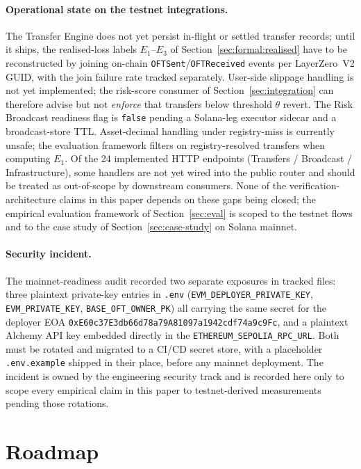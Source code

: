 \documentclass[11pt,a4paper]{article}
\begin{document}
\paragraph{Operational state on the testnet integrations.} The Transfer Engine
does not yet persist in-flight or settled transfer records; until it ships, the
realised-loss labels $E_1$--$E_3$ of Section~\ref{sec:formal:realised} have to
be reconstructed by joining on-chain \texttt{OFTSent}/\texttt{OFTReceived}
events per LayerZero~V2 GUID, with the join failure rate tracked separately.
User-side slippage handling is not yet implemented; the risk-score consumer
of Section~\ref{sec:integration} can therefore advise but not \emph{enforce}
that transfers below threshold $\theta$ revert. The Risk Broadcast readiness
flag is \texttt{false} pending a Solana-leg executor sidecar and a broadcast-store
TTL. Asset-decimal handling under registry-miss is currently unsafe; the
evaluation framework filters on registry-resolved transfers when computing
$E_1$. Of the 24 implemented HTTP endpoints (Transfers / Broadcast /
Infrastructure), some handlers are not yet wired into the public router and
should be treated as out-of-scope by downstream consumers. None of the
verification-architecture claims in this paper depends on these gaps being
closed; the empirical evaluation framework of Section~\ref{sec:eval} is scoped
to the testnet flows and to the case study of Section~\ref{sec:case-study} on
Solana mainnet.

\paragraph{Security incident.} The mainnet-readiness audit recorded two
separate exposures in tracked files: three plaintext private-key entries in
\texttt{.env} (\texttt{EVM\_DEPLOYER\_PRIVATE\_KEY},
\texttt{EVM\_PRIVATE\_KEY}, \texttt{BASE\_OFT\_OWNER\_PK}) all carrying the
same secret for the deployer EOA
\texttt{0xE60c37E3db66d78a79A81097a1942cdf74a9c9Fc}, and a plaintext Alchemy
API key embedded directly in the \texttt{ETHEREUM\_SEPOLIA\_RPC\_URL}. Both
must be rotated and migrated to a CI/CD secret store, with a placeholder
\texttt{.env.example} shipped in their place, before any mainnet deployment.
The incident is owned by the engineering security track and is recorded here
only to scope every empirical claim in this paper to testnet-derived
measurements pending those rotations.

\section{Roadmap}\label{sec:roadmap}
\end{document}

